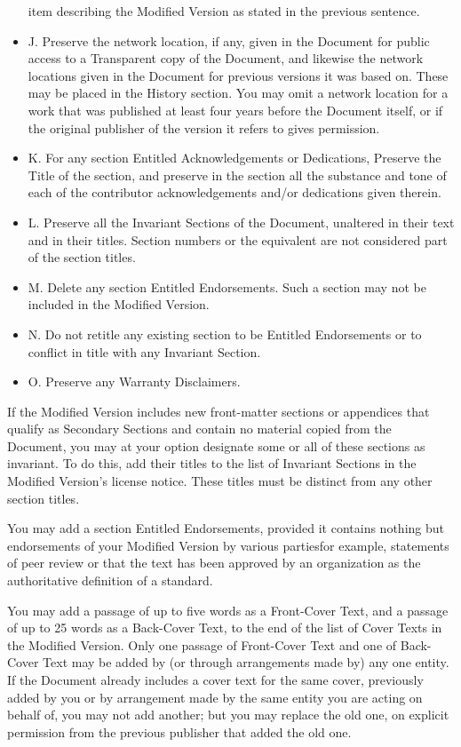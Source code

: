 \documentclass[10pt,english]{article}
\begin{document}
\begin{itemize}
item describing the Modified Version as stated in the previous sentence.
\item J. Preserve the network location, if any, given in the Document for
public access to a Transparent copy of the Document, and likewise
the network locations given in the Document for previous versions
it was based on. These may be placed in the \textquotedbl{}History\textquotedbl{}
section. You may omit a network location for a work that was published
at least four years before the Document itself, or if the original
publisher of the version it refers to gives permission.
\item K. For any section Entitled \textquotedbl{}Acknowledgements\textquotedbl{}
or \textquotedbl{}Dedications\textquotedbl{}, Preserve the Title of
the section, and preserve in the section all the substance and tone
of each of the contributor acknowledgements and/or dedications given
therein.
\item L. Preserve all the Invariant Sections of the Document, unaltered
in their text and in their titles. Section numbers or the equivalent
are not considered part of the section titles.
\item M. Delete any section Entitled \textquotedbl{}Endorsements\textquotedbl{}.
Such a section may not be included in the Modified Version.
\item N. Do not retitle any existing section to be Entitled \textquotedbl{}Endorsements\textquotedbl{}
or to conflict in title with any Invariant Section.
\item O. Preserve any Warranty Disclaimers.
\end{itemize}
If the Modified Version includes new front-matter sections or appendices
that qualify as Secondary Sections and contain no material copied
from the Document, you may at your option designate some or all of
these sections as invariant. To do this, add their titles to the list
of Invariant Sections in the Modified Version's license notice. These
titles must be distinct from any other section titles.

You may add a section Entitled \textquotedbl{}Endorsements\textquotedbl{},
provided it contains nothing but endorsements of your Modified Version
by various parties\textemdash{}for example, statements of peer review
or that the text has been approved by an organization as the authoritative
definition of a standard.

You may add a passage of up to five words as a Front-Cover Text, and
a passage of up to 25 words as a Back-Cover Text, to the end of the
list of Cover Texts in the Modified Version. Only one passage of Front-Cover
Text and one of Back-Cover Text may be added by (or through arrangements
made by) any one entity. If the Document already includes a cover
text for the same cover, previously added by you or by arrangement
made by the same entity you are acting on behalf of, you may not add
another; but you may replace the old one, on explicit permission from
the previous publisher that added the old one.
\end{document}
